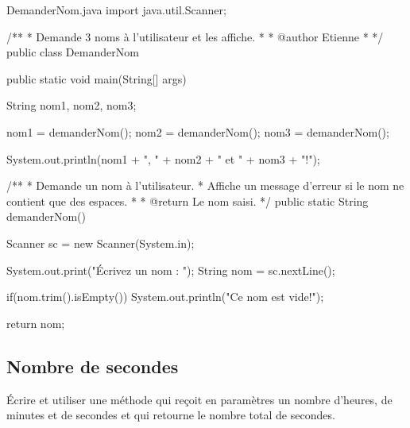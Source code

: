 \documentclass[12pt]{article}
\begin{document}
\begin{MyTCB}{DemanderNom.java}
import java.util.Scanner;

/**
 * Demande 3 noms à l'utilisateur et les affiche.
 * 
 * @author Etienne
 *
 */
public class DemanderNom {

	
	public static void main(String[] args) {

		String nom1, nom2, nom3;
		
		nom1 = demanderNom();
		nom2 = demanderNom();
		nom3 = demanderNom();
		
		System.out.println(nom1 + ", " + nom2 + " et " + nom3 + "!");		

	}
	
	
	/**
	 * Demande un nom à l'utilisateur.
	 * Affiche un message d'erreur si le nom ne contient que des espaces.
	 * 
	 * @return Le nom saisi.
	 */
	public static String demanderNom() {
		
		Scanner sc = new Scanner(System.in);
		
		System.out.print("Écrivez un nom : ");
		String nom = sc.nextLine();
		
		if(nom.trim().isEmpty())
			System.out.println("Ce nom est vide!");
		
		return nom;
		
	}

}

\end{MyTCB}

\subsection{Nombre de secondes}

Écrire et utiliser une méthode qui reçoit en paramètres un nombre d'heures, de minutes et de secondes et qui retourne le nombre total de secondes.
\end{document}
